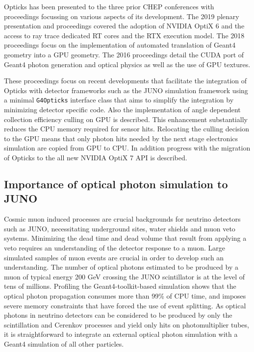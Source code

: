 \documentclass{webofc}
\begin{document}
Opticks has been presented to the three prior CHEP conferences with proceedings
focussing on various aspects of its development. The 2019 plenary presentation 
and proceedings\cite{chep2019} covered the adoption of NVIDIA OptiX 6 and the 
access to ray trace dedicated RT cores and the RTX execution model. 
The 2018 proceedings\cite{chep2018} focus on the implementation of automated
translation of Geant4 geometry into a GPU geometry.
The 2016 proceedings\cite{chep2016} detail the CUDA port of Geant4 photon generation 
and optical physics as well as the use of GPU textures. 
%

These proceedings focus on recent developments that facilitate the integration of Opticks 
with detector frameworks such as the JUNO simulation framework using a minimal 
{\tt G4Opticks} interface class that aims to simplify the integration 
by minimizing detector specific code. Also the implementation of angle dependent 
collection efficiency culling on GPU is described. This enhancement substantially 
reduces the CPU memory required for sensor hits.  Relocating the culling 
decision to the GPU means that only photon hits needed by the next stage electronics simulation 
are copied from GPU to CPU. In addition progress with the migration of Opticks to the 
all new NVIDIA OptiX 7 API is described.
%
%
\subsection{Importance of optical photon simulation to JUNO}%
%
%
Cosmic muon induced processes are crucial backgrounds for neutrino
detectors such as JUNO\cite{juno},
necessitating underground sites, water shields and muon veto systems.
Minimizing the dead time and dead volume that result from applying
a veto requires an understanding of the detector response to a muon.
Large simulated samples of muon events are crucial in order to
develop such an understanding.
%
The number of optical photons estimated to be produced by a muon of
typical energy 200 GeV crossing the JUNO scintillator is at the level of tens of millions.
Profiling the Geant4-toolkit-based simulation shows that the optical photon propagation 
consumes more than 99\% of CPU time, and imposes severe memory constraints that have forced
the use of event splitting.  
%
As optical photons in neutrino detectors can be considered to be produced
by only the scintillation and Cerenkov processes and yield only hits
on photomultiplier tubes, it is straightforward to integrate an
external optical photon simulation with a Geant4 simulation of all other particles.
%
\end{document}
